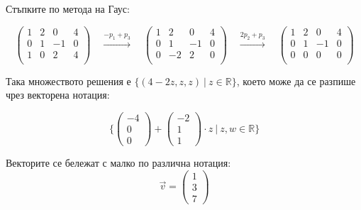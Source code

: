 \documentclass{subfiles}
\begin{document}
\noindent Стъпките по метода на Гаус:

\begin{equation*}
    \left(
        \begin{array}{ ccc|c }
            1 & 2 & 0 & 4 \\
            0 & 1 & -1 & 0 \\
            1 & 0 & 2 & 4 \\
        \end{array}
    \right)
    \quad
    \overset{-p_{1}+p_{3}}{\longrightarrow}
    \quad
    \left(
        \begin{array}{ ccc|c }
            1 & 2 & 0 & 4 \\
            0 & 1 & -1 & 0 \\
            0 & -2 & 2 & 0 \\
        \end{array}
    \right)
    \quad
    \overset{2p_{2}+p_{3}}{\longrightarrow}
    \quad
    \left(
        \begin{array}{ ccc|c }
            1 & 2 & 0 & 4 \\
            0 & 1 & -1 & 0 \\
            0 & 0 & 0 & 0 \\
        \end{array}
    \right)
\end{equation*}

\noindent Така множеството решения е $\{(4 − 2z, z, z)\ |\ z \in \mathbb{R} \}$, което може да се разпише чрез векторена нотация:

\begin{equation*}
    \{
        \left(\begin{array}{ c }-4 \\ 0 \\ 0 \end{array}\right) +
        \left(\begin{array}{ c }-2 \\ 1 \\ 1  \end{array}\right) \cdot z
        \ | \ z, w \in \mathbb{R}
    \}
\end{equation*}

\noindent Векторите се бележат с малко по различна нотация:
\begin{equation*}
    \overrightarrow{v} = \left(\begin{array}{ c }1 \\ 3 \\ 7\end{array}\right)
\end{equation*}
\end{document}
